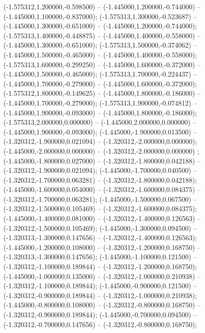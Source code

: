  (-1.575312,1.200000,-0.598500) -- (-1.445000,1.200000,-0.744000) -- (-1.445000,1.100000,-0.837000);
 (-1.575313,1.300000,-0.523687) -- (-1.445000,1.300000,-0.651000) -- (-1.445000,1.200000,-0.744000);
 (-1.575313,1.400000,-0.448875) -- (-1.445000,1.400000,-0.558000) -- (-1.445000,1.300000,-0.651000);
 (-1.575313,1.500000,-0.374062) -- (-1.445000,1.500000,-0.465000) -- (-1.445000,1.400000,-0.558000);
 (-1.575313,1.600000,-0.299250) -- (-1.445000,1.600000,-0.372000) -- (-1.445000,1.500000,-0.465000);
 (-1.575313,1.700000,-0.224437) -- (-1.445000,1.700000,-0.279000) -- (-1.445000,1.600000,-0.372000);
 (-1.575312,1.800000,-0.149625) -- (-1.445000,1.800000,-0.186000) -- (-1.445000,1.700000,-0.279000);
 (-1.575313,1.900000,-0.074812) -- (-1.445000,1.900000,-0.093000) -- (-1.445000,1.800000,-0.186000);
 (-1.575313,2.000000,0.000000) -- (-1.445000,2.000000,0.000000) -- (-1.445000,1.900000,-0.093000);
 (-1.445000,-1.900000,0.013500) -- (-1.320312,-1.900000,0.021094) -- (-1.320312,-2.000000,0.000000);
 (-1.445000,-2.000000,0.000000) -- (-1.320312,-2.000000,0.000000) ;
 (-1.445000,-1.800000,0.027000) -- (-1.320312,-1.800000,0.042188) -- (-1.320312,-1.900000,0.021094);
 (-1.445000,-1.700000,0.040500) -- (-1.320312,-1.700000,0.063281) -- (-1.320312,-1.800000,0.042188);
 (-1.445000,-1.600000,0.054000) -- (-1.320312,-1.600000,0.084375) -- (-1.320312,-1.700000,0.063281);
 (-1.445000,-1.500000,0.067500) -- (-1.320312,-1.500000,0.105469) -- (-1.320312,-1.600000,0.084375);
 (-1.445000,-1.400000,0.081000) -- (-1.320312,-1.400000,0.126563) -- (-1.320312,-1.500000,0.105469);
 (-1.445000,-1.300000,0.094500) -- (-1.320313,-1.300000,0.147656) -- (-1.320312,-1.400000,0.126563);
 (-1.445000,-1.200000,0.108000) -- (-1.320312,-1.200000,0.168750) -- (-1.320313,-1.300000,0.147656);
 (-1.445000,-1.100000,0.121500) -- (-1.320312,-1.100000,0.189844) -- (-1.320312,-1.200000,0.168750);
 (-1.445000,-1.000000,0.135000) -- (-1.320312,-1.000000,0.210938) -- (-1.320312,-1.100000,0.189844);
 (-1.445000,-0.900000,0.121500) -- (-1.320312,-0.900000,0.189844) -- (-1.320312,-1.000000,0.210938);
 (-1.445000,-0.800000,0.108000) -- (-1.320312,-0.800000,0.168750) -- (-1.320312,-0.900000,0.189844);
 (-1.445000,-0.700000,0.094500) -- (-1.320312,-0.700000,0.147656) -- (-1.320312,-0.800000,0.168750);
